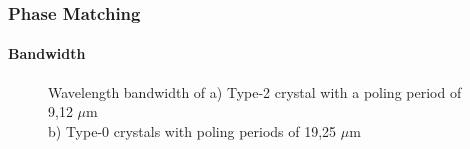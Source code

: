 \documentclass[serif,8pt]{beamer}
\begin{document}
\begin{frame}[t]
	\frametitle{Phase Matching}
	\framesubtitle{Bandwidth}
	\begin{figure}[!ht]
	  \centering
	  \caption{Wavelength bandwidth of a) Type-2 crystal with a poling period of 9,12 $\mu$m\\ b) Type-0 crystals with poling periods of 19,25 $\mu$m}
	  \quad
	  \label{fig:CompT0a2}
	\end{figure}
\end{frame}
\end{document}
